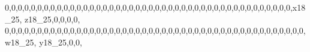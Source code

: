 \documentclass[]{article}
\newenvironment{Shaded}{\begin{snugshade}}{\end{snugshade}}
\newcommand{\DecValTok}[1]{\textcolor[rgb]{0.00,0.00,0.81}{#1}}
\newcommand{\NormalTok}[1]{#1}
\begin{document}
\begin{Shaded}
\begin{Highlighting}[]
\DecValTok{0}\NormalTok{,}\DecValTok{0}\NormalTok{,}\DecValTok{0}\NormalTok{,}\DecValTok{0}\NormalTok{,}\DecValTok{0}\NormalTok{,}\DecValTok{0}\NormalTok{,}\DecValTok{0}\NormalTok{,}\DecValTok{0}\NormalTok{,}\DecValTok{0}\NormalTok{,}\DecValTok{0}\NormalTok{,}\DecValTok{0}\NormalTok{,}\DecValTok{0}\NormalTok{,}\DecValTok{0}\NormalTok{,}\DecValTok{0}\NormalTok{,}\DecValTok{0}\NormalTok{,}\DecValTok{0}\NormalTok{,}\DecValTok{0}\NormalTok{,}\DecValTok{0}\NormalTok{,}\DecValTok{0}\NormalTok{,}\DecValTok{0}\NormalTok{,}\DecValTok{0}\NormalTok{,}\DecValTok{0}\NormalTok{,}\DecValTok{0}\NormalTok{,}\DecValTok{0}\NormalTok{,}\DecValTok{0}\NormalTok{,}\DecValTok{0}\NormalTok{,}\DecValTok{0}\NormalTok{,}\DecValTok{0}\NormalTok{,}\DecValTok{0}\NormalTok{,}\DecValTok{0}\NormalTok{,}\DecValTok{0}\NormalTok{,}\DecValTok{0}\NormalTok{,}\DecValTok{0}\NormalTok{,}\DecValTok{0}\NormalTok{,}\DecValTok{0}\NormalTok{,}\DecValTok{0}\NormalTok{,}\DecValTok{0}\NormalTok{,}\DecValTok{0}\NormalTok{,}\DecValTok{0}\NormalTok{,}\DecValTok{0}\NormalTok{,}\DecValTok{0}\NormalTok{,}\DecValTok{0}\NormalTok{,}\DecValTok{0}\NormalTok{,}\DecValTok{0}\NormalTok{,x18_}\DecValTok{25}\NormalTok{, z18_}\DecValTok{25}\NormalTok{,}\DecValTok{0}\NormalTok{,}\DecValTok{0}\NormalTok{,}\DecValTok{0}\NormalTok{,}\DecValTok{0}\NormalTok{,}
\DecValTok{0}\NormalTok{,}\DecValTok{0}\NormalTok{,}\DecValTok{0}\NormalTok{,}\DecValTok{0}\NormalTok{,}\DecValTok{0}\NormalTok{,}\DecValTok{0}\NormalTok{,}\DecValTok{0}\NormalTok{,}\DecValTok{0}\NormalTok{,}\DecValTok{0}\NormalTok{,}\DecValTok{0}\NormalTok{,}\DecValTok{0}\NormalTok{,}\DecValTok{0}\NormalTok{,}\DecValTok{0}\NormalTok{,}\DecValTok{0}\NormalTok{,}\DecValTok{0}\NormalTok{,}\DecValTok{0}\NormalTok{,}\DecValTok{0}\NormalTok{,}\DecValTok{0}\NormalTok{,}\DecValTok{0}\NormalTok{,}\DecValTok{0}\NormalTok{,}\DecValTok{0}\NormalTok{,}\DecValTok{0}\NormalTok{,}\DecValTok{0}\NormalTok{,}\DecValTok{0}\NormalTok{,}\DecValTok{0}\NormalTok{,}\DecValTok{0}\NormalTok{,}\DecValTok{0}\NormalTok{,}\DecValTok{0}\NormalTok{,}\DecValTok{0}\NormalTok{,}\DecValTok{0}\NormalTok{,}\DecValTok{0}\NormalTok{,}\DecValTok{0}\NormalTok{,}\DecValTok{0}\NormalTok{,}\DecValTok{0}\NormalTok{,}\DecValTok{0}\NormalTok{,}\DecValTok{0}\NormalTok{,}\DecValTok{0}\NormalTok{,}\DecValTok{0}\NormalTok{,}\DecValTok{0}\NormalTok{,}\DecValTok{0}\NormalTok{,}\DecValTok{0}\NormalTok{,}\DecValTok{0}\NormalTok{,}\DecValTok{0}\NormalTok{,}\DecValTok{0}\NormalTok{,}\DecValTok{0}\NormalTok{,}\DecValTok{0}\NormalTok{,w18_}\DecValTok{25}\NormalTok{, y18_}\DecValTok{25}\NormalTok{,}\DecValTok{0}\NormalTok{,}\DecValTok{0}\NormalTok{,}

\end{Highlighting}
\end{Shaded}
\end{document}
